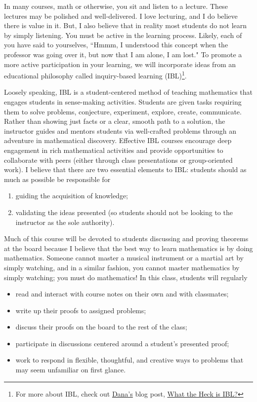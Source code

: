 In many courses, math or otherwise, you sit and listen to a lecture. These lectures may be polished and well-delivered. I love lecturing, and I do believe there is value in it. But, I also believe that in reality most students do not learn by simply listening. You must be active in the learning process. Likely, each of you have said to yourselves, ``Hmmm, I understood this concept when the professor was going over it, but now that I am alone, I am lost." To promote a more active participation in your learning, we will incorporate ideas from an educational philosophy called inquiry-based learning (IBL)\footnote{For more about IBL, check out \href{https://danaernst.com}{Dana's} blog post, \href{http://maamathedmatters.blogspot.com/2013/05/what-heck-is-ibl.html}{What the Heck is IBL?}}.

Loosely speaking, IBL is a student-centered method of teaching mathematics that engages students in sense-making activities.  Students are given tasks requiring them to solve problems, conjecture, experiment, explore, create, communicate.  Rather than showing just facts or a clear, smooth path to a solution, the instructor guides and mentors students via well-crafted problems through an adventure in mathematical discovery.  Effective IBL courses encourage deep engagement in rich mathematical activities and provide opportunities to collaborate with peers (either through class presentations or group-oriented work). I believe that there are two essential elements to IBL: students should as much as possible be responsible for
\begin{enumerate}
\item guiding the acquisition of knowledge;
\item validating the ideas presented (so students should not be looking to the instructor as the sole authority).
\end{enumerate}


Much of this course will be devoted to students discussing and proving theorems at the board because I believe that the best way to learn mathematics is by doing mathematics. Someone cannot master a musical instrument or a martial art by simply watching, and in a similar fashion, you cannot master mathematics by simply watching; you must do mathematics! In this class, students will regularly 
\begin{itemize}
\item read and interact with course notes on their own and with classmates;
\item write up their proofs to assigned problems;
\item discuss their proofs on the board to the rest of the class;
\item participate in discussions centered around a student's presented proof;
\item work to respond in flexible, thoughtful, and creative ways to problems that may seem unfamiliar on first glance.
\end{itemize}

